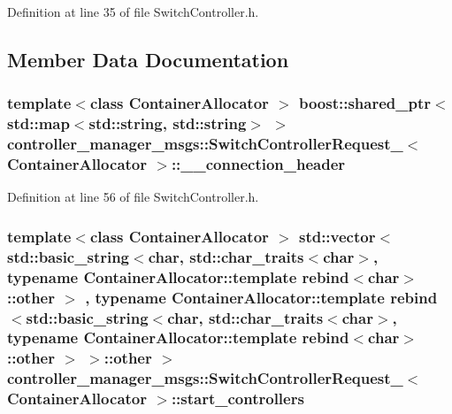 \-Definition at line 35 of file \-Switch\-Controller.\-h.



\subsection{\-Member \-Data \-Documentation}
\subsubsection[{\-\_\-\-\_\-connection\-\_\-header}]{\setlength{\rightskip}{0pt plus 5cm}template$<$class Container\-Allocator $>$ boost\-::shared\-\_\-ptr$<$std\-::map$<$std\-::string, std\-::string$>$ $>$ {\bf controller\-\_\-manager\-\_\-msgs\-::\-Switch\-Controller\-Request\-\_\-}$<$ \-Container\-Allocator $>$\-::{\bf \-\_\-\-\_\-connection\-\_\-header}}\label{structcontroller__manager__msgs_1_1SwitchControllerRequest___a6132aa1589f0c8c5169fa14457a47041}


\-Definition at line 56 of file \-Switch\-Controller.\-h.

\subsubsection[{start\-\_\-controllers}]{\setlength{\rightskip}{0pt plus 5cm}template$<$class Container\-Allocator $>$ std\-::vector$<$std\-::basic\-\_\-string$<$char, std\-::char\-\_\-traits$<$char$>$, typename \-Container\-Allocator\-::template rebind$<$char$>$\-::other $>$ , typename \-Container\-Allocator\-::template rebind$<$std\-::basic\-\_\-string$<$char, std\-::char\-\_\-traits$<$char$>$, typename \-Container\-Allocator\-::template rebind$<$char$>$\-::other $>$ $>$\-::other $>$ {\bf controller\-\_\-manager\-\_\-msgs\-::\-Switch\-Controller\-Request\-\_\-}$<$ \-Container\-Allocator $>$\-::{\bf start\-\_\-controllers}}\label{structcontroller__manager__msgs_1_1SwitchControllerRequest___a65c1664b2cdf1b041a19a746aa144c76}


